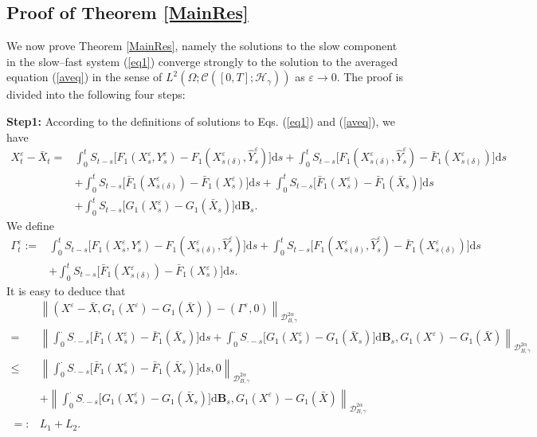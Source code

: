 \documentclass[10pt,a4paper]{article}
\numberwithin{equation}{section}
\begin{document}
\subsection{Proof of Theorem \ref{MainRes}}\label{proof}






We now prove Theorem \ref{MainRes}, namely the solutions to the slow component in the slow--fast system (\ref{eq1}) converge strongly to the solution to the averaged equation (\ref{aveq}) in the sense of $L^2(\Omega; \mathcal C([0,T]; \mathcal H_\gamma))$ as $\varepsilon \to 0$.
The proof is divided into the following four steps:




\textbf{Step1:} According to the definitions of solutions to Eqs. (\ref{eq1}) and (\ref{aveq}), we have
\begin{align*}
X_t^\varepsilon-\bar{X}_t
=& \int_0^t S_{t-s} \big[ F_1(X_s^\varepsilon,Y_s^\varepsilon)-F_1(X_{s(\delta)}^\varepsilon,\hat{Y}_s^\varepsilon) \big] \mathrm{d} s +\int_0^t S_{t-s} \big[F_1(X_{s(\delta)}^\varepsilon,\hat{Y}_s^\varepsilon)-\bar{F}_1(X_{s(\delta)}^\varepsilon) \big]\mathrm{d} s \nonumber\\
&+\int_0^t S_{t-s} \big[\bar{F}_1(X_{s(\delta)}^\varepsilon)-\bar{F}_1(X_s^\varepsilon) \big]\mathrm{d} s  \nonumber+\int_0^t S_{t-s} \big[\bar{F}_1(X_s^\varepsilon)-\bar{F}_1(\bar{X}_s) \big]\mathrm{d} s  \nonumber\\
&+ \int_0^t S_{t-s} \big[G_1(X_s^\varepsilon)-G_1(\bar{X}_s) \big] \mathrm{d} \mathbf B_s.
\end{align*}
We define
\begin{align*}
\varGamma_t^\varepsilon
:=& \int_0^t S_{t-s} \big[F_1(X_s^\varepsilon,Y_s^\varepsilon)-F_1(X_{s(\delta)}^\varepsilon,\hat{Y}_s^\varepsilon) \big]\mathrm{d} s +\int_0^t S_{t-s} \big[F_1(X_{s(\delta)}^\varepsilon,\hat{Y}_s^\varepsilon)-\bar{F}_1(X_{s(\delta)}^\varepsilon) \big]\mathrm{d} s\nonumber\\
&+\int_0^t S_{t-s} \big[\bar{F}_1(X_{s(\delta)}^\varepsilon)-\bar{F}_1(X_s^\varepsilon) \big]\mathrm{d} s.
\end{align*}
It is easy to deduce that
\begin{align}\label{Xdif}
&\left\|(X^\varepsilon-\bar{X}, G_1(X^\varepsilon)-G_1(\bar{X}))-(\varGamma^\varepsilon,0) \right\|_{\mathcal{D}_{ B,\gamma}^{2\alpha}} \nonumber\\
= &\left\| \int_0^\cdot S_{\cdot-s} \big[\bar{F}_1(X_s^\varepsilon)-\bar{F}_1(\bar{X}_s) \big]\mathrm{d} s+\int_0^\cdot S_{\cdot-s} \big[G_1(X_s^\varepsilon)-G_1(\bar{X}_s) \big] \mathrm{d} \mathbf B_s, G_1(X^\varepsilon)-G_1(\bar{X})  \right\|_{\mathcal{D}_{ B,\gamma}^{2\alpha}} \nonumber\\
\leq & \left\| \int_0^\cdot S_{\cdot-s} \big[\bar{F}_1(X_s^\varepsilon)-\bar{F}_1(\bar{X}_s) \big]\mathrm{d} s,0 \right\|_{\mathcal{D}_{ B,\gamma}^{2\alpha}} \nonumber\\
&+\left\|\int_0^\cdot S_{\cdot-s} \big[G_1(X_s^\varepsilon)-G_1(\bar{X}_s) \big] \mathrm{d} \mathbf B_s, G_1(X^\varepsilon)-G_1(\bar{X})  \right\|_{\mathcal{D}_{ B,\gamma}^{2\alpha}} \nonumber\\
=:& L_1+L_2.
\end{align}
\end{document}
